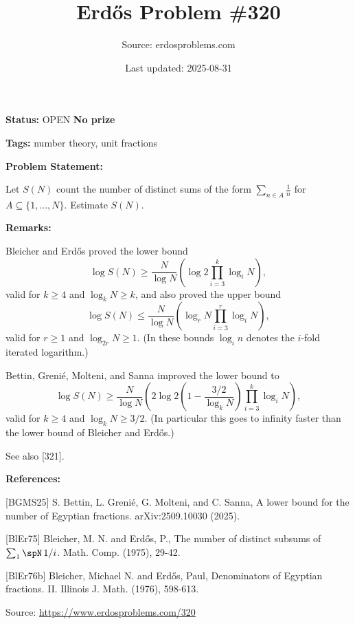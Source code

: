 \documentclass{article}
\title{Erd\H{o}s Problem \#320}
\date{Last updated: 2025-08-31}
\author{Source: erdosproblems.com}
\begin{document}
\maketitle

\noindent\textbf{Status:} OPEN \quad \textbf{No prize}

\noindent\textbf{Tags:} number theory, unit fractions

\medskip
\noindent\textbf{Problem Statement:}

Let $S(N)$ count the number of distinct sums of the form $\sum_{n\in A}\frac{1}{n}$ for $A\subseteq \{1,\ldots,N\}$. Estimate $S(N)$.

\bigskip
\noindent\textbf{Remarks:}

Bleicher and Erd\H{o}s \cite{BlEr75} proved the lower bound\[\log S(N)\geq \frac{N}{\log N}\left(\log 2\prod_{i=3}^k\log_iN\right),\]valid for $k\geq 4$ and $\log_kN\geq k$, and also \cite{BlEr76b} proved the upper bound\[\log S(N)\leq \frac{N}{\log N}\left(\log_r N \prod_{i=3}^r \log_iN\right),\]valid for $r\geq 1$ and $\log_{2r}N\geq 1$. (In these bounds $\log_in$ denotes the $i$-fold iterated logarithm.)

Bettin, Greni\'{e}, Molteni, and Sanna \cite{BGMS25} improved the lower bound to\[\log S(N) \geq \frac{N}{\log N}\left(2\log 2\left(1-\frac{3/2}{\log_kN}\right)\prod_{i=3}^k\log_iN\right),\]valid for $k\geq 4$ and $\log_kN\geq 3/2$. (In particular this goes to infinity faster than the lower bound of Bleicher and Erd\H{o}s.)

See also [321].

\bigskip
\noindent\textbf{References:}

[BGMS25] S. Bettin, L. Greni\'{e}, G. Molteni, and C. Sanna, A lower bound for the number of Egyptian fractions. arXiv:2509.10030 (2025).
 
 [BlEr75] Bleicher, M. N. and Erd\H{o}s, P., The number of distinct subsums of $\sum \sb{1}\spN\,1/i$. Math. Comp. (1975), 29-42.
 
 [BlEr76b] Bleicher, Michael N. and Erd\H{o}s, Paul, Denominators of Egyptian fractions. II. Illinois J. Math. (1976), 598-613.

\bigskip
\noindent\small{Source: \url{https://www.erdosproblems.com/320}}
\end{document}

